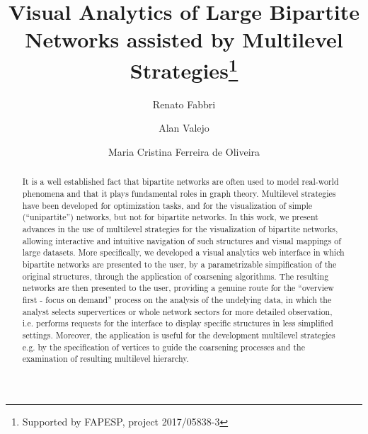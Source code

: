 \documentclass[runningheads]{llncs}
\begin{document}
%
\title{Visual Analytics of Large Bipartite Networks assisted by Multilevel Strategies\thanks{Supported by FAPESP, project 2017/05838-3}}
%
%
\author{Renato Fabbri \and
Alan Valejo \and
Maria Cristina Ferreira de Oliveira}
%
%
%
\maketitle
%
\begin{abstract}
  It is a well established fact that bipartite networks are often used to
  model real-world phenomena and that it plays fundamental roles in
  graph theory.
  Multilevel strategies have been developed for optimization tasks, and for the visualization of simple (``unipartite'') networks, but not for bipartite networks.
  In this work, we present advances in the use of multilevel strategies for the
  visualization of bipartite networks, allowing interactive and intuitive navigation of such structures and visual mappings of large datasets.
  More specifically, we developed a visual analytics web interface in which
  bipartite networks are presented to the user, by a parametrizable simpification
  of the original structures, through the application of coarsening algorithms.
  The resulting networks are then presented to the user,
  providing a genuine route for the ``overview first - focus on demand''
  process on the analysis of the undelying data, in which the analyst
  selects supervertices or whole network sectors for more detailed observation,
  i.e. performs requests for the interface to display 
  specific structures in less simplified settings.
  Moreover, the application is useful for the development multilevel strategies
  e.g. by the specification of vertices to guide the coarsening processes and
  the examination of resulting multilevel hierarchy.

\end{abstract}
%
%
%
\end{document}
